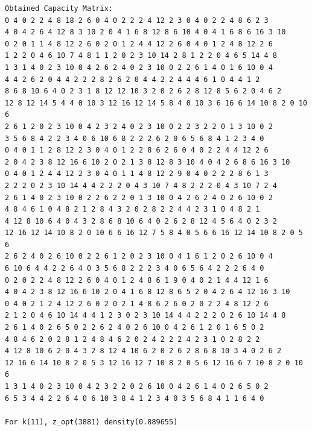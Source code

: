 \documentclass[11pt]{article}
\begin{document}
\begin{lstlisting}
Obtained Capacity Matrix:
0 4 0 2 2 4 8 18 2 6 0 4 0 2 2 2 4 12 2 3 0 4 0 2 2 4 8 6 2 3
4 0 4 2 6 4 12 8 3 10 2 0 4 1 6 8 12 8 6 10 4 0 4 1 6 8 6 16 3 10
0 2 0 1 1 4 8 12 2 6 0 2 0 1 2 4 4 12 2 6 0 4 0 1 2 4 8 12 2 6
1 2 2 0 4 6 10 7 4 8 1 1 2 0 2 3 10 14 2 8 1 2 2 0 4 6 5 14 4 8
1 3 1 4 0 2 3 10 0 4 2 6 2 4 0 2 3 10 0 2 2 6 1 4 0 1 6 10 0 4
4 4 2 6 2 0 4 4 2 2 2 8 2 6 2 0 4 4 2 2 4 4 4 6 1 0 4 4 1 2
8 6 8 10 6 4 0 2 3 1 8 12 12 10 3 2 0 2 6 2 8 12 8 5 6 2 0 4 6 2
12 8 12 14 5 4 4 0 10 3 12 16 12 14 5 8 4 0 10 3 6 16 6 14 10 8 2 0 10 6
2 6 1 2 0 2 3 10 0 4 2 3 2 4 0 2 3 10 0 2 2 3 2 2 0 1 3 10 0 2
3 5 6 8 4 2 2 3 4 0 6 10 6 8 2 2 2 6 2 0 6 5 6 8 4 1 2 3 4 0
0 4 0 1 1 2 8 12 2 3 0 4 0 1 2 2 8 6 2 6 0 4 0 2 2 4 4 12 2 6
2 0 4 2 3 8 12 16 6 10 2 0 2 1 3 8 12 8 3 10 4 0 4 2 6 8 6 16 3 10
0 4 0 1 2 4 4 12 2 3 0 4 0 1 1 4 8 12 2 9 0 4 0 2 2 2 8 6 1 3
2 2 2 0 2 3 10 14 4 4 2 2 2 0 4 3 10 7 4 8 2 2 2 0 4 3 10 7 2 4
2 6 1 4 0 2 3 10 0 2 2 6 2 2 0 1 3 10 0 4 2 6 2 4 0 2 6 10 0 2
4 8 4 6 1 0 4 8 2 1 2 8 4 3 2 0 2 8 2 2 4 4 2 3 1 0 4 8 2 1
4 12 8 10 6 4 0 4 3 2 8 6 8 10 6 4 0 2 6 2 8 12 4 5 6 4 0 2 3 2
12 16 12 14 10 8 2 0 10 6 6 16 12 7 5 8 4 0 5 6 6 16 12 14 10 8 2 0 5 6
2 6 2 4 0 2 6 10 0 2 2 6 1 2 0 2 3 10 0 4 1 6 1 2 0 2 6 10 0 4
6 10 6 4 4 2 2 6 4 0 3 5 6 8 2 2 2 3 4 0 6 5 6 4 2 2 2 6 4 0
0 2 0 2 2 4 8 12 2 6 0 4 0 1 2 4 8 6 1 9 0 4 0 2 1 4 4 12 1 6
4 0 4 2 3 8 12 16 6 10 2 0 4 1 6 8 12 8 6 5 2 0 4 2 6 4 12 16 3 10
0 4 0 2 1 2 4 12 2 6 0 2 0 2 1 4 8 6 2 6 0 2 0 2 2 4 8 12 2 6
2 1 2 0 4 6 10 14 4 4 1 2 3 0 2 3 10 14 4 4 2 2 2 0 2 6 10 14 4 8
2 6 1 4 0 2 6 5 0 2 2 6 2 4 0 2 6 10 0 4 2 6 1 2 0 1 6 5 0 2
4 8 4 6 2 0 2 8 1 2 4 8 4 6 2 0 2 4 2 2 2 4 2 3 1 0 2 8 2 2
4 12 8 10 6 2 0 4 3 2 8 12 4 10 6 2 0 2 6 2 8 6 8 10 3 4 0 2 6 2
12 16 6 14 10 8 2 0 5 3 12 16 12 7 10 8 2 0 5 6 12 16 6 7 10 8 2 0 10 6
1 3 1 4 0 2 3 10 0 4 2 3 2 2 0 2 6 10 0 4 2 6 1 4 0 2 6 5 0 2
6 5 3 4 4 2 2 6 4 0 6 10 3 8 4 1 2 3 4 0 3 5 6 8 4 1 1 6 4 0

For k(11), z_opt(3881) density(0.889655)


\end{lstlisting}
\end{document}
